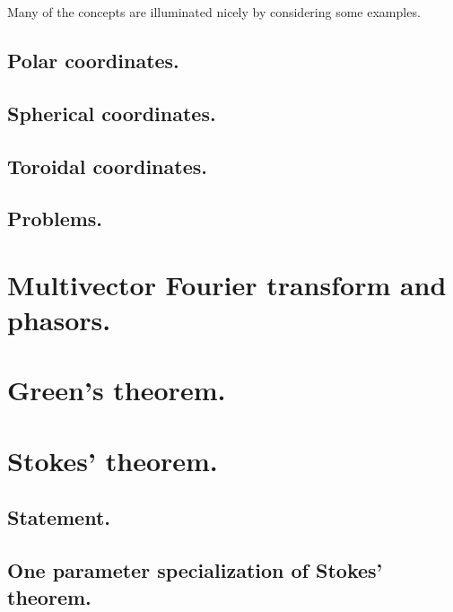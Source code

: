       Many of the concepts are illuminated nicely by considering some examples.

      \subsection{Polar coordinates.}
         

      \subsection{Spherical coordinates.}
         

      \subsection{Toroidal coordinates.}
         

      \subsection{Problems.}
         
         

   \section{Multivector Fourier transform and phasors.}
      
   \section{Green's theorem.}
      
   \section{Stokes' theorem.}
      \subsection{Statement.}
         
      \subsection{One parameter specialization of Stokes' theorem.}
         

